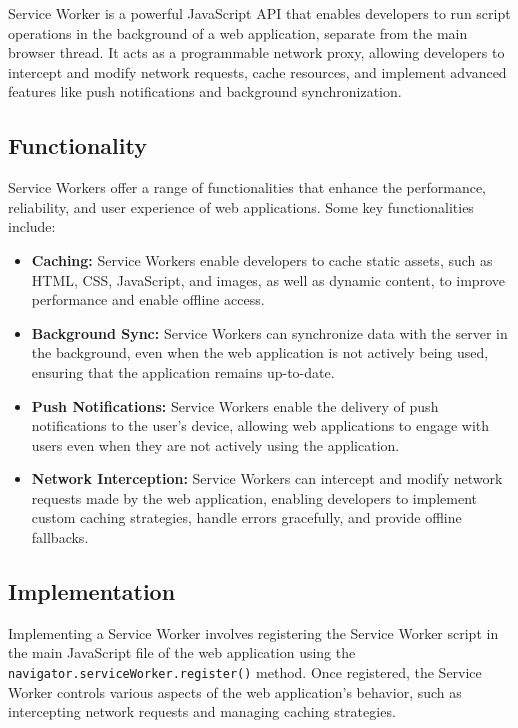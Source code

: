 \documentclass[12pt, a4paper, twoside]{article}
\begin{document}
Service Worker is a powerful JavaScript API that enables developers to run script operations in the background of a web application, separate from the main browser thread. It acts as a programmable network proxy, allowing developers to intercept and modify network requests, cache resources, and implement advanced features like push notifications and background synchronization.

\subsection{Functionality}
\label{subsec:sw-functionality}

Service Workers offer a range of functionalities that enhance the performance, reliability, and user experience of web applications. Some key functionalities include:

\begin{itemize}
  \item \textbf{Caching:} Service Workers enable developers to cache static assets, such as HTML, CSS, JavaScript, and images, as well as dynamic content, to improve performance and enable offline access.
  
  \item \textbf{Background Sync:} Service Workers can synchronize data with the server in the background, even when the web application is not actively being used, ensuring that the application remains up-to-date.
  
  \item \textbf{Push Notifications:} Service Workers enable the delivery of push notifications to the user's device, allowing web applications to engage with users even when they are not actively using the application.
  
  \item \textbf{Network Interception:} Service Workers can intercept and modify network requests made by the web application, enabling developers to implement custom caching strategies, handle errors gracefully, and provide offline fallbacks.
\end{itemize}

\subsection{Implementation}
\label{subsec:sw-implementation}

Implementing a Service Worker involves registering the Service Worker script in the main JavaScript file of the web application using the \texttt{navigator.serviceWorker.register()} method. Once registered, the Service Worker controls various aspects of the web application's behavior, such as intercepting network requests and managing caching strategies.
\end{document}
